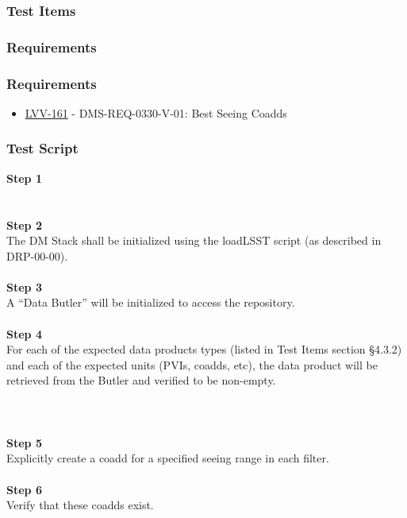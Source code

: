 \hypertarget{test-items-3}{%
\subsubsection{Test Items}\label{test-items-3}}

\hypertarget{requirements-6}{%
\subsubsection{Requirements}\label{requirements-6}}

\hypertarget{requirements-7}{%
\subsubsection{Requirements}\label{requirements-7}}

\begin{itemize}
\tightlist
\item
  \href{https://jira.lsstcorp.org/browse/LVV-161}{LVV-161} -
  DMS-REQ-0330-V-01: Best Seeing Coadds
\end{itemize}

\hypertarget{test-script-3}{%
\subsubsection{Test Script}\label{test-script-3}}

\textbf{Step 1}\\
~\\
~\\
\textbf{Step 2}\\
The DM Stack shall be initialized using the loadLSST script (as
described in DRP-00-00).\\
~\\
\textbf{Step 3}\\
A ``Data Butler'' will be initialized to access the repository.\\
~\\
\textbf{Step 4}\\
For each of the expected data products types (listed in Test Items
section §4.3.2) and each of the expected units (PVIs, coadds, etc), the
data product will be retrieved from the Butler and verified to be
non-empty.\\
~\\
~\\
~\\
\textbf{Step 5}\\
Explicitly create a coadd for a specified seeing range in each filter.\\
~\\
\textbf{Step 6}\\
Verify that these coadds exist.\\
~\\

